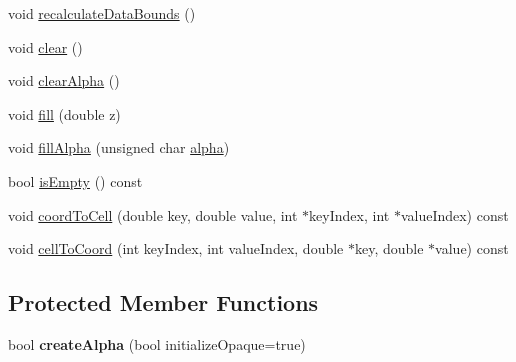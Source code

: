 \begin{DoxyCompactItemize}
\item 
void \hyperlink{class_q_c_p_color_map_data_ab235ade8a4d64bd3adb26a99b3dd57ee}{recalculate\+Data\+Bounds} ()
\item 
void \hyperlink{class_q_c_p_color_map_data_a9910ba830e96955bd5c8e5bef1e77ef3}{clear} ()
\item 
void \hyperlink{class_q_c_p_color_map_data_a14d08b9c3720cd719400079b86d3906b}{clear\+Alpha} ()
\item 
void \hyperlink{class_q_c_p_color_map_data_a350f783260eb9b5de5c7b5e0d5d3e3c2}{fill} (double z)
\item 
void \hyperlink{class_q_c_p_color_map_data_a93e2a549d7702bc849cd48a585294657}{fill\+Alpha} (unsigned char \hyperlink{class_q_c_p_color_map_data_a4f7e6b7a97017400cbbd46f0660e68ea}{alpha})
\item 
bool \hyperlink{class_q_c_p_color_map_data_aea88cc75a76ca571acf29b2ba8ac970d}{is\+Empty} () const
\item 
void \hyperlink{class_q_c_p_color_map_data_aca5b29e0ca2f299c9060fc6e1f74d0c8}{coord\+To\+Cell} (double key, double value, int $\ast$key\+Index, int $\ast$value\+Index) const
\item 
void \hyperlink{class_q_c_p_color_map_data_af1a36385c78ab624cd617065602408b6}{cell\+To\+Coord} (int key\+Index, int value\+Index, double $\ast$key, double $\ast$value) const
\end{DoxyCompactItemize}
\subsection*{Protected Member Functions}
\begin{DoxyCompactItemize}
\item 
\mbox{\label{class_q_c_p_color_map_data_a42c2b1c303683515fa4de4c551f54441}} 
bool {\bfseries create\+Alpha} (bool initialize\+Opaque=true)
\end{DoxyCompactItemize}
